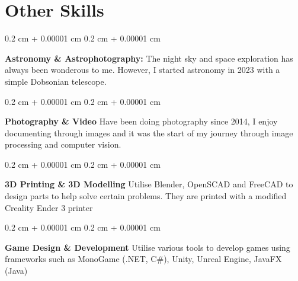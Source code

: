 \documentclass[10pt, letterpaper]{article}
\newenvironment{onecolentry}{
    \begin{adjustwidth}{
        0.2 cm + 0.00001 cm
    }{
        0.2 cm + 0.00001 cm
    }
}{
    \end{adjustwidth}
} %
\begin{document}
    \section{Other Skills}

        
        \begin{onecolentry}
            \textbf{Astronomy \& Astrophotography:} The night sky and space exploration has always been wonderous to me. 
                However, I started astronomy in 2023 with a simple Dobsonian telescope.
        \end{onecolentry}

        \vspace{0.2 cm}

        \begin{onecolentry}
            \textbf{Photography \& Video} Have been doing photography since 2014, I enjoy documenting through images and 
                it was the start of my journey through image processing and computer vision.
        \end{onecolentry}

        \vspace{0.2 cm}

        \begin{onecolentry}
            \textbf{3D Printing \& 3D Modelling} Utilise Blender, OpenSCAD and FreeCAD to design parts to help solve certain problems. 
                They are printed with a modified Creality Ender 3 printer
        \end{onecolentry}

        \vspace{0.2 cm}

        \begin{onecolentry}
            \textbf{Game Design \& Development} Utilise various tools to develop games using frameworks such as MonoGame (.NET, C\#), Unity, Unreal Engine, JavaFX (Java)
        \end{onecolentry}
    
\end{document}
